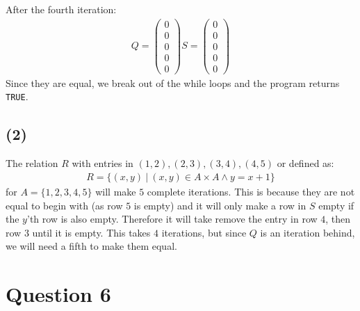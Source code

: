 \documentclass[a4paper, fleqn]{article}
\begin{document}
After the fourth iteration:
\begin{align*}
  Q=\begin{pmatrix}
  0 \\
  0 \\
  0 \\
  0 \\
  0
  \end{pmatrix}
  S =\begin{pmatrix}
  0 \\
  0 \\
  0 \\
  0 \\
  0
  \end{pmatrix}
\end{align*}
Since they are equal, we break out of the while loops and the program returns \texttt{TRUE}.

\subsection*{(2)}
The relation $R$ with entries in $(1,2),(2,3),(3,4),(4,5)$ or defined as:
\begin{align*}
  R = \{(x,y)\ |\ (x,y)\in A \times A \land y=x+1\}
\end{align*}
for $A=\{1,2,3,4,5\}$ will make $5$ complete iterations. This is because they are not equal to begin with (as row $5$ is empty) and it will only make a row in $S$ empty if the $y$'th row is also empty. Therefore it will take remove the entry in row $4$, then row $3$ until it is empty. This takes $4$ iterations, but since $Q$ is an iteration behind, we will need a fifth to make them equal.

\section*{Question 6}
\end{document}
